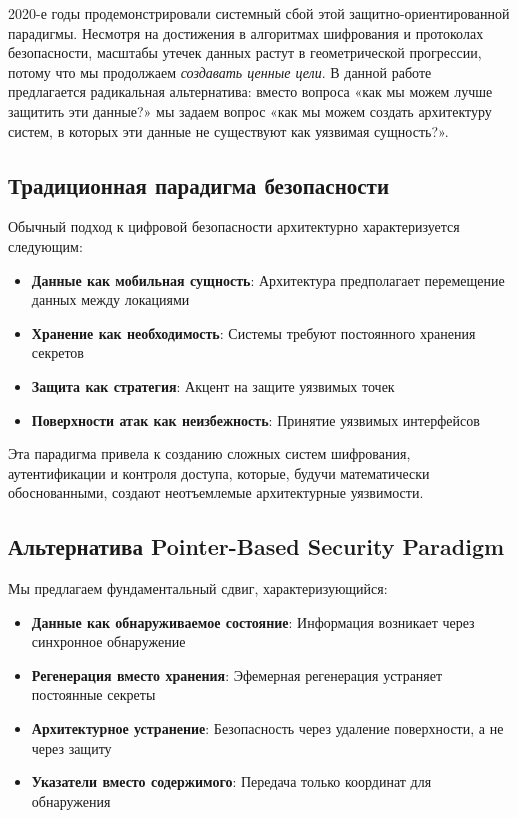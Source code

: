 \documentclass[11pt,a4paper]{article}
\begin{document}
2020-е годы продемонстрировали системный сбой этой защитно-ориентированной парадигмы. Несмотря на достижения в алгоритмах шифрования и протоколах безопасности, масштабы утечек данных растут в геометрической прогрессии, потому что мы продолжаем \emph{создавать ценные цели}. В данной работе предлагается радикальная альтернатива: вместо вопроса «как мы можем лучше защитить эти данные?» мы задаем вопрос «как мы можем создать архитектуру систем, в которых эти данные не существуют как уязвимая сущность?».

\subsection{Традиционная парадигма безопасности}

Обычный подход к цифровой безопасности архитектурно характеризуется следующим:

\begin{itemize}
    \item \textbf{Данные как мобильная сущность}: Архитектура предполагает перемещение данных между локациями
    \item \textbf{Хранение как необходимость}: Системы требуют постоянного хранения секретов
    \item \textbf{Защита как стратегия}: Акцент на защите уязвимых точек
    \item \textbf{Поверхности атак как неизбежность}: Принятие уязвимых интерфейсов
\end{itemize}

Эта парадигма привела к созданию сложных систем шифрования, аутентификации и контроля доступа, которые, будучи математически обоснованными, создают неотъемлемые архитектурные уязвимости.

\subsection{Альтернатива Pointer-Based Security Paradigm}

Мы предлагаем фундаментальный сдвиг, характеризующийся:

\begin{itemize}
    \item \textbf{Данные как обнаруживаемое состояние}: Информация возникает через синхронное обнаружение
    \item \textbf{Регенерация вместо хранения}: Эфемерная регенерация устраняет постоянные секреты
    \item \textbf{Архитектурное устранение}: Безопасность через удаление поверхности, а не через защиту
    \item \textbf{Указатели вместо содержимого}: Передача только координат для обнаружения
\end{itemize}
\end{document}

